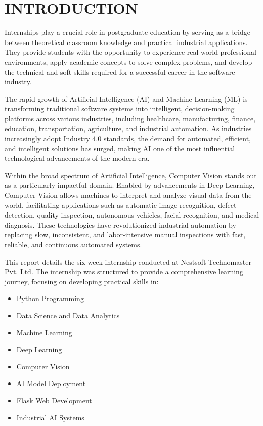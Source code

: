 \chapter{INTRODUCTION}

Internships play a crucial role in postgraduate education by serving as a bridge between theoretical classroom knowledge and practical industrial applications. They provide students with the opportunity to experience real-world professional environments, apply academic concepts to solve complex problems, and develop the technical and soft skills required for a successful career in the software industry.

The rapid growth of Artificial Intelligence (AI) and Machine Learning (ML) is transforming traditional software systems into intelligent, decision-making platforms across various industries, including healthcare, manufacturing, finance, education, transportation, agriculture, and industrial automation. As industries increasingly adopt Industry 4.0 standards, the demand for automated, efficient, and intelligent solutions has surged, making AI one of the most influential technological advancements of the modern era.

Within the broad spectrum of Artificial Intelligence, Computer Vision stands out as a particularly impactful domain. Enabled by advancements in Deep Learning, Computer Vision allows machines to interpret and analyze visual data from the world, facilitating applications such as automatic image recognition, defect detection, quality inspection, autonomous vehicles, facial recognition, and medical diagnosis. These technologies have revolutionized industrial automation by replacing slow, inconsistent, and labor-intensive manual inspections with fast, reliable, and continuous automated systems.

This report details the six-week internship conducted at Nestsoft Technomaster Pvt. Ltd. The internship was structured to provide a comprehensive learning journey, focusing on developing practical skills in:
\begin{itemize}[leftmargin=1.5cm]
    \item Python Programming
    \item Data Science and Data Analytics
    \item Machine Learning
    \item Deep Learning
    \item Computer Vision
    \item AI Model Deployment
    \item Flask Web Development
    \item Industrial AI Systems
\end{itemize}


